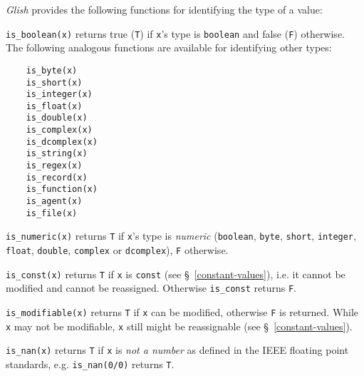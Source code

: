 {\em Glish} provides the following functions for identifying the 
type of a value:
\begin{list}{}{}

\item[{\tt is\_boolean(x)}]
returns true ({\tt T}) if {\tt x}'s type is
{\tt boolean} and false ({\tt F}) otherwise.    The following analogous
functions are available for identifying other types:
\begin{verbatim}
    is_byte(x)
    is_short(x)
    is_integer(x)
    is_float(x)
    is_double(x)
    is_complex(x)
    is_dcomplex(x)
    is_string(x)
    is_regex(x)
    is_record(x)
    is_function(x)
    is_agent(x)
    is_file(x)
\end{verbatim}
\label{is_boolean-func}
\label{is_byte-func}
\label{is_short-func}
\label{is_integer-func}
\label{is_float-func}
\label{is_double-func}
\label{is_complex-func}
\label{is_dcomplex-func}
\label{is_string-func}
\label{is_record-func}
\label{is_function-func}
\label{is_agent-func}

\item[{\tt is\_numeric(x)}] \label{is_numeric-func} 
returns {\tt T} if {\tt x}'s type is {\em numeric}
({\tt boolean}, {\tt byte}, {\tt short},
{\tt integer}, {\tt float}, {\tt double}, {\tt complex} or
{\tt dcomplex}), {\tt F} otherwise.

\item[{\tt is\_const(x)}] \label{is_const-func} 
returns {\tt T} if {\tt x} is {\tt const} (see \S~\ref{constant-values}),
i.e. it cannot be modified and cannot be reassigned. Otherwise {\tt is\_const}
returns {\tt F}.

\item[{\tt is\_modifiable(x)}] \label{is_modifiable-func} 
returns {\tt T} if {\tt x} can be modified, otherwise {\tt F} is returned. While
{\tt x} may not be modifiable, {\tt x} still might be reassignable
(see \S~\ref{constant-values}).

\item[{\tt is\_nan(x)}] \label{is_nan-func} 
returns {\tt T} if {\tt x} is {\em not a number} as defined in the IEEE floating
point standards, e.g. {\tt is\_nan(0/0)} returns {\tt T}.


\end{list}
